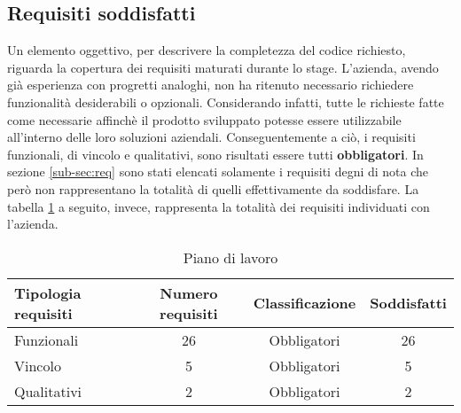 \subsection{Requisiti soddisfatti}
Un elemento oggettivo, per descrivere la completezza del codice richiesto, riguarda la copertura dei requisiti maturati durante lo stage.
L’azienda, avendo già esperienza con progretti analoghi, non ha ritenuto necessario richiedere funzionalità 
desiderabili o opzionali. Considerando infatti, tutte le richieste fatte come necessarie affinchè il prodotto sviluppato potesse essere utilizzabile
all'interno delle loro soluzioni aziendali.
Conseguentemente a ciò, i requisiti funzionali, di vincolo e qualitativi, sono risultati essere tutti \textbf{obbligatori}.
In sezione \ref{sub-sec:req} sono stati elencati solamente i requisiti degni di nota che però non rappresentano la totalità di quelli 
effettivamente da soddisfare.
La tabella \ref{tab:req-solved} a seguito, invece, rappresenta la totalità dei requisiti individuati con l’azienda.
\begin{table}[h!]
    \begin{tabularx}{\textwidth}{ | X | c | c | c | }
    \hline
    \textbf{Tipologia requisiti} & \textbf{Numero requisiti} & \textbf{Classificazione} & \textbf{Soddisfatti}\\
    \hline
    Funzionali & 26 & Obbligatori & 26 \\
    \hline
    Vincolo & 5 & Obbligatori & 5 \\
    \hline
    Qualitativi & 2 & Obbligatori & 2 \\
    \hline
    \end{tabularx}
    \caption{Piano di lavoro}
    \label{tab:req-solved}
\end{table}